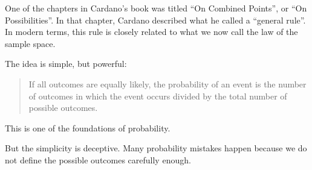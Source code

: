 \documentclass[
  letterpaper,
  DIV=11,
  numbers=noendperiod]{scrreprt}
\begin{document}
One of the chapters in Cardano's book was titled ``On Combined Points'',
or ``On Possibilities''. In that chapter, Cardano described what he
called a ``general rule''. In modern terms, this rule is closely related
to what we now call the law of the sample space.

The idea is simple, but powerful:

\begin{quote}
If all outcomes are equally likely, the probability of an event is the
number of outcomes in which the event occurs divided by the total number
of possible outcomes.
\end{quote}

This is one of the foundations of probability.

But the simplicity is deceptive. Many probability mistakes happen
because we do not define the possible outcomes carefully enough.
\end{document}
